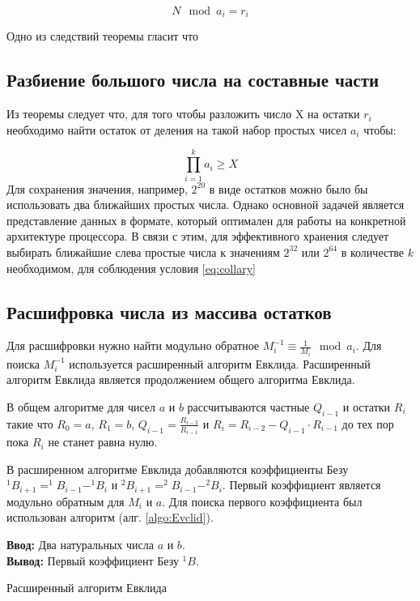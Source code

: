 \documentclass[10pt]{article}
\begin{document}
\begin{equation}
	N \mod a_i = r_i
	\label{eq:rem_th}
\end{equation}

Одно из следствий теоремы гласит что 

\subsection{Разбиение большого числа на составные части}

Из теоремы следует что, для того чтобы разложить число X на остатки $r_i$ необходимо найти остаток от деления на такой набор простых чисел $a_i$ чтобы:

\begin{equation}
	\prod\limits_{i=1}^k a_i \geqslant X
	\label{eq:collary}
\end{equation}
Для сохранения значения, например, $2^{20}$ в виде остатков можно было бы использовать два ближайших простых числа. Однако основной задачей является представление данных в формате, который оптимален для работы на конкретной архитектуре процессора. В связи с этим, для эффективного хранения следует выбирать ближайшие слева простые числа к значениям $2^{32}$ или $2^{64}$ в количестве $k$ необходимом, для соблюдения условия \ref{eq:collary} 

\subsection{Расшифровка числа из массива остатков}

Для расшифровки нужно найти модульно обратное $M_i^{-1}\equiv\frac{1}{M_i}\mod a_i$. Для поиска $M_i^{-1}$ используется расширенный алгоритм Евклида.
Расширенный алгоритм Евклида \cite{Okulov2011} является продолжением общего алгоритма Евклида. 

В общем алгоритме для чисел $a$ и $b$ рассчитываются частные $Q_{i-1}$ и остатки $R_i$ такие что $R_0 = a$, $R_1 = b$, $Q_{i-1} = \frac{R_{i-2}}{R_{i-1}}$ и $R_i = R_{i-2} - Q_{i-1} \cdot R_{i-1}$ до тех пор пока $R_i$ не станет равна нулю.

В расширенном алгоритме Евклида добавляются коэффициенты Безу $^1B_{i+1} = ^1B_{i-1} - ^1B_{i}$ и $^2B_{i+1} = ^2B_{i-1} - ^2B_{i}$. Первый коэффициент является модульно обратным для $M_i$ и $a$. Для поиска первого коэффициента был использован алгоритм (алг. \ref{algo:Evclid}).


\begin{algorithm}[H]
	\textbf{Ввод:} Два натуральных числа $a$ и $b$.\\
	\textbf{Вывод:} Первый коэффициент Безу $^1B$.
	\begin{algorithmic}
		\ENDWHILE {}
	\end{algorithmic}
	\caption{Расширенный алгоритм Евклида}
	\label{algo:Evclid}
\end{algorithm}
\end{document}
